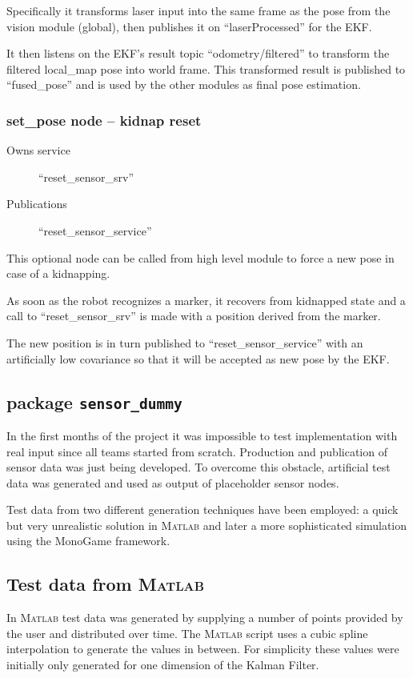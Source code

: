 Specifically it transforms laser input into the same frame as the pose from the vision module (global), then publishes it on ``laserProcessed'' for the EKF.

It then listens on the EKF's result topic ``odometry/filtered'' to transform the filtered local\_map pose into world frame. This transformed result is published to ``fused\_pose'' and is used by the other modules as final pose estimation.

\subsubsection{set\_pose node -- kidnap reset}
\begin{description}
\item[Owns service] ``reset\_sensor\_srv''
\item[Publications] ``reset\_sensor\_service''
\end{description}

This optional node can be called from high level module to force a new pose in case of a kidnapping.

As soon as the robot recognizes a marker, it recovers from kidnapped state and a call to ``reset\_sensor\_srv'' is made with a position derived from the marker.

The new position is in turn published to ``reset\_sensor\_service'' with an artificially low covariance so that it will be accepted as new pose by the EKF.

\subsection{package \texttt{sensor\_dummy}}
In the first months of the project it was impossible to test implementation with real input since all teams started from scratch. Production and publication of sensor data was just being developed. To overcome this obstacle, artificial test data was generated and used as output of placeholder sensor nodes. 

Test data from two different generation techniques have been employed: a quick but very unrealistic solution in \textsc{Matlab} and later a more sophisticated simulation using the MonoGame framework.

\subsection{Test data from \textsc{Matlab}}
In \textsc{Matlab} test data was generated by supplying a number of points provided by the user and distributed over time. The \textsc{Matlab} script uses a cubic spline interpolation to generate the values in between. For simplicity these values were initially only generated for one dimension of the Kalman Filter.

